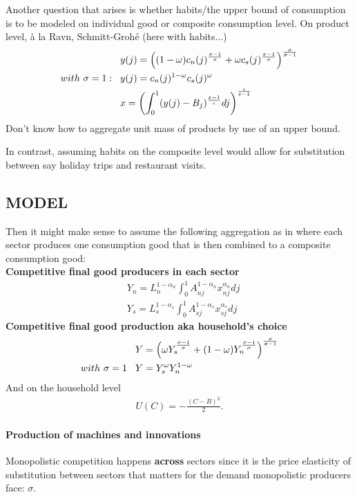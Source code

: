 Another question that arises is whether habits/the upper bound of consumption is to be modeled on individual good or composite consumption level.
On product level, à la Ravn, Schmitt-Grohé (here with habits...)
\begin{align*}
&y(j)=\left((1-\omega)c_n(j)^{\frac{\sigma-1}{\sigma}} +\omega c_s(j)^{\frac{\sigma-1}{\sigma}}\right)^\frac{\sigma}{\sigma-1}\\
with\ \sigma =1: \hspace{3mm}& y(j)=c_n(j)^{1-\omega}c_s(j)^\omega \\
&	x= \left(\int_{0}^{1} (y(j)- B_j)^{\frac{\varepsilon-1}{\varepsilon}}dj\right)^{\frac{\varepsilon}{\varepsilon-1}}
\end{align*}
Don't know how to aggregate unit mass of products by use of an upper bound. 

In contrast, assuming habits on the composite level would allow for substitution between say holiday trips and restaurant visits.

\subsection{MODEL}
Then it might make sense to assume the following aggregation as in \cite{Acemoglu2012TheChange} where each sector produces one  consumption good that is then combined to a composite consumption good: \\

\noindent\textbf{Competitive final good producers in each sector}
\begin{align*}
&Y_n= L_n^{1-\alpha_n}\int_{0}^{1}A_{nj}^{1-\alpha_n}x_{nj}^{\alpha_n} dj\\
&Y_s= L_s^{1-\alpha_s}\int_{0}^{1}A_{sj}^{1-\alpha_s}x_{sj}^{\alpha_s} dj
\end{align*}
\textbf{Competitive final good production aka household's choice}
\begin{align*}
&Y=\left(\omega Y_s^{\frac{\sigma-1}{\sigma}}+(1-\omega)Y_n^{\frac{\sigma-1}{\sigma}}\right)^{\frac{\sigma}{\sigma-1}}\\
with \ \sigma=1 \hspace{3mm} & Y=Y_s^\omega Y_n^{1-\omega}
\end{align*}
And on the household level
\begin{align*}
U(C)=-\frac{(C-B)^2}{2}.
\end{align*}

\paragraph{Production of machines and innovations \citep{Acemoglu2012TheChange}}
Monopolistic competition happens \textbf{across} sectors since it is the price elasticity of substitution between sectors that matters for the demand monopolistic producers face: $\sigma$.

